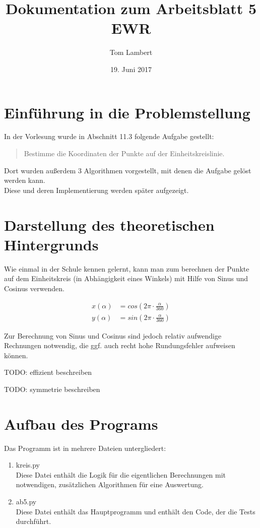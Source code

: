 \documentclass{scrartcl}
\title{Dokumentation zum Arbeitsblatt 5 EWR}
\author{Tom Lambert}
\date{19. Juni 2017}
\begin{document}
	
	\maketitle
	\tableofcontents
	
	\section{Einführung in die Problemstellung}
	
	In der Vorlesung wurde in Abschnitt 11.3 folgende Aufgabe gestellt:
	
	\begin{quote}
		Bestimme die Koordinaten der Punkte auf der Einheitskreislinie.
	\end{quote}
	
	Dort wurden außerdem 3 Algorithmen vorgestellt, mit denen die Aufgabe gelöst werden kann. \\
	Diese und deren Implementierung werden später aufgezeigt.
	
	
	
	\section{Darstellung des theoretischen Hintergrunds}
	
	Wie einmal in der Schule kennen gelernt, kann man zum berechnen der Punkte auf dem Einheitskreis (in Abhängigkeit eines Winkels) mit Hilfe von Sinus und Cosinus verwenden.
	
	\begin{align}
		x(\alpha) &= cos(2\pi\cdot \frac{\alpha}{360}) \\
		y(\alpha) &= sin(2\pi\cdot \frac{\alpha}{360})
	\end{align}
	
	Zur Berechnung von Sinus und Cosinus sind jedoch relativ aufwendige Rechnungen notwendig, die ggf. auch recht hohe Rundungsfehler aufweisen können.
	
	TODO: effizient beschreiben
	
	TODO: symmetrie beschreiben
	
	
	
	\section{Aufbau des Programs}
	
	Das Programm ist in mehrere Dateien untergliedert:
	
	\begin{enumerate}
		\item kreis.py \\ Diese Datei enthält die Logik für die eigentlichen Berechnungen mit notwendigen, zusätzlichen Algorithmen für eine Auswertung.
		\item ab5.py \\ Diese Datei enthält das Hauptprogramm und enthält den Code, der die Tests durchführt.
	\end{enumerate}
	
\end{document}
